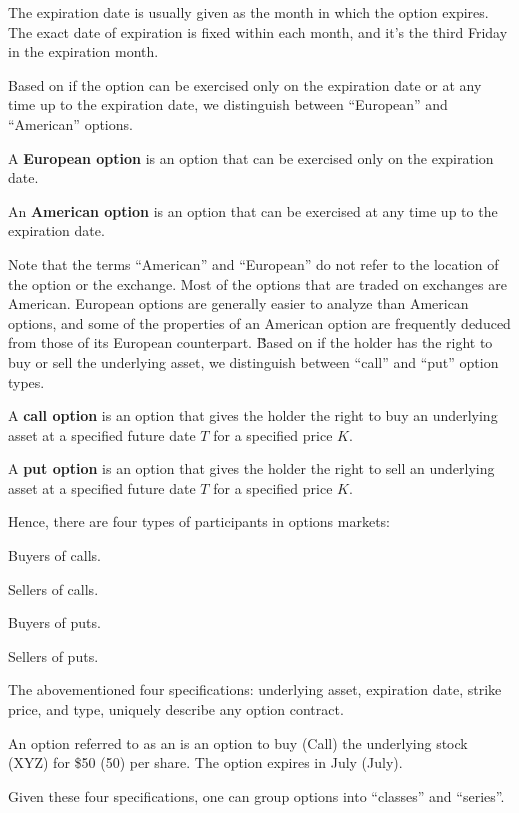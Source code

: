 The expiration date is usually given as the month in which the option expires. The exact date of expiration is fixed
within each month, and it's the third Friday in the expiration month.

Based on if the option can be exercised only on the expiration date or at any time up to the expiration date, we
distinguish between ``European'' and ``American'' options.

A \textbf{European option} is an option that can be exercised only on the expiration date.
\ed

An \textbf{American option} is an option that can be exercised at any time up to the expiration date.
\ed

Note that the terms ``American'' and ``European'' do not refer to the location of the option or the exchange. Most of
the options that are traded on exchanges are American. European options are generally easier to analyze than American
options, and some of the properties of an American option are frequently deduced from those of its European counterpart.
\v

Based on if the holder has the right to buy or sell the underlying asset, we distinguish between ``call'' and ``put''
option types.

A \textbf{call option} is an option that gives the holder the right to buy an underlying asset at a specified future
date $T$ for a specified price $K$.
\ed

A \textbf{put option} is an option that gives the holder the right to sell an underlying asset at a specified future
date $T$ for a specified price $K$.
\ed

Hence, there are four types of participants in options markets:
\bit
\item Buyers of calls.
\item Sellers of calls.
\item Buyers of puts.
\item Sellers of puts.
\eit

The abovementioned four specifications: underlying asset, expiration date, strike price, and type, uniquely describe
any option contract.

\be
An option referred to as an  is an option to buy (Call) the underlying stock (XYZ) for \$50
(50) per share. The option expires in July (July).
\ee

Given these four specifications, one can group options into ``classes'' and ``series''.

